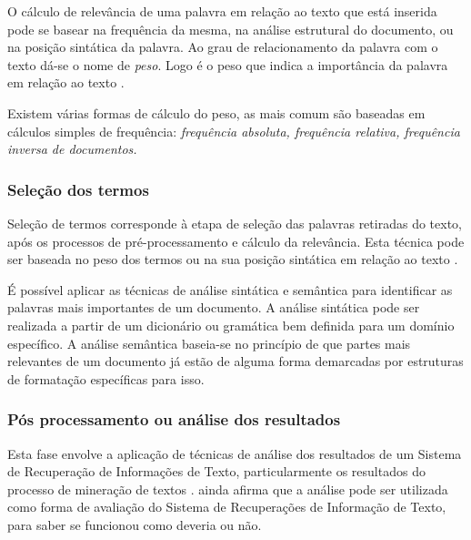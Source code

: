 O cálculo de relevância de uma palavra em relação ao texto que está inserida pode se basear na frequência da mesma, na análise estrutural do documento, ou na posição sintática da palavra. Ao grau de relacionamento da palavra com o texto dá-se o nome de \textit{peso}. Logo é o peso que indica a importância da palavra em relação ao texto \cite{morais2007mineraccao}. 

Existem várias formas de cálculo do peso, as mais comum são baseadas em cálculos simples de frequência: \textit{frequência absoluta, frequência relativa, frequência inversa de documentos.}

\subsubsection{Seleção dos termos}
Seleção de termos corresponde à etapa de seleção das palavras retiradas do texto, após os
processos de pré-processamento e cálculo da relevância. Esta técnica pode ser baseada no peso dos termos ou na sua posição sintática em relação ao texto \cite{morais2007mineraccao}.

É possível aplicar as técnicas de análise sintática e semântica para identificar as palavras mais importantes de um documento. A análise sintática pode ser realizada a partir de um  dicionário ou gramática bem definida para um domínio específico. A análise semântica baseia-se no princípio de que partes mais relevantes de um documento já estão de alguma forma demarcadas por estruturas de formatação específicas para isso.

\subsubsection{Pós processamento ou análise dos resultados}
Esta fase envolve a aplicação de técnicas de análise dos resultados de um Sistema de Recuperação de Informações de Texto, particularmente os resultados do processo de mineração de textos \cite{morais2007mineraccao}.
 ainda afirma que a análise pode ser utilizada como forma de avaliação do Sistema de Recuperações de Informação de Texto, para saber se funcionou como deveria ou não.

